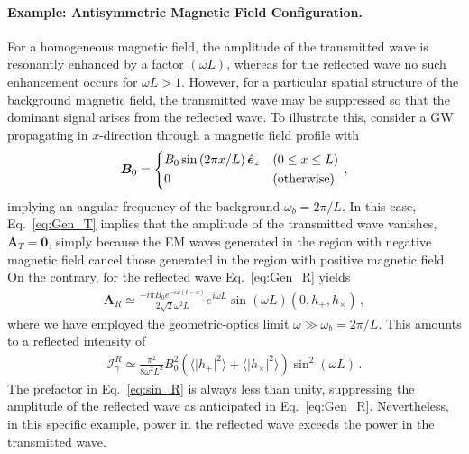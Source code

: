 \documentclass[a4paper,11pt]{article}
\begin{document}
\paragraph{Example: Antisymmetric Magnetic Field Configuration.}
%
For a homogeneous magnetic field, the amplitude of the transmitted wave is resonantly enhanced by a factor $(\omega L)$, whereas for the reflected wave no such enhancement occurs for $\omega L > 1$.
%
However, for a particular spatial structure of the background magnetic field, the transmitted wave may be suppressed so that the dominant signal arises from the reflected wave.
%
To illustrate this, consider a GW propagating in $x$-direction through a magnetic field profile with
%
\begin{align}
    {\bm B}_0 = \begin{dcases}
    B_{0} \sin \left(2 \pi  x / L  \right) \hat{\bm e}_{z} & (0 \leq x \leq L ) \\
    0 & (\text{otherwise})
    \end{dcases} \,,
\end{align}
%
implying an angular frequency of the background $ \omega_{b} = 2 \pi / L $.
%
In this case, Eq.~\eqref{eq:Gen_T} implies that the amplitude of the transmitted wave vanishes, ${\bm A}_{T} = {\bm 0}$, simply because the EM waves generated in the region with negative magnetic field cancel those generated in the region with positive magnetic field.
%
On the contrary, for the reflected wave Eq.~\eqref{eq:Gen_R} yields
%
\begin{align}
   {\bm A}_{R} \simeq \frac{- i \pi B_0 e^{- i \omega (t-x)}  }{2 \sqrt{2} \omega^2 L} e^{i \omega L} \sin(\omega L)   \left( 0, h_{+}, h_{\times} \right) \,,
\end{align}
%
where we have employed the geometric-optics limit $\omega \gg \omega_b = 2 \pi/L$. This amounts to a reflected intensity of
%
\begin{align}
  \mathcal{I}_{\gamma}^{R}
  \simeq
 \frac{ \pi^2}{8 \omega^{2} L^{2}} B_{0}^{2} ( \langle \vert h_{+} \vert^{2} \rangle + \langle \vert h_{\times} \vert^{2} \rangle) \sin^2(\omega L) \,.
 \label{eq:sin_R}
\end{align}
%
The prefactor in Eq.~\eqref{eq:sin_R} is always less than unity, suppressing the amplitude of the reflected wave as anticipated in Eq.~\eqref{eq:Gen_R}.
%
Nevertheless, in this specific example, power in the reflected wave exceeds the power in the transmitted wave.
\end{document}

